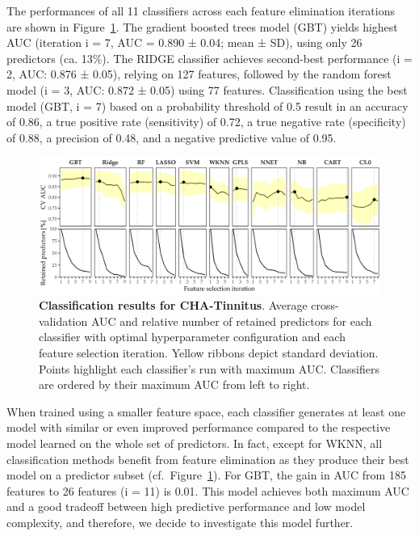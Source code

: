 \documentclass[
  oneside]{book}
\begin{document}
The performances of all 11 classifiers across each feature elimination iterations are shown in Figure~\ref{fig:08-results-pone}.
The gradient boosted trees model (GBT) yields highest AUC (iteration i = 7, AUC = 0.890 ± 0.04; mean ± SD), using only 26 predictors (ca. 13\%).
The RIDGE classifier achieves second-best performance (i = 2, AUC: 0.876 ± 0.05), relying on 127 features, followed by the random forest model (i = 3, AUC: 0.872 ± 0.05) using 77 features.
Classification using the best model (GBT, i = 7) based on a probability threshold of 0.5 result in an accuracy of 0.86, a true positive rate (sensitivity) of 0.72, a true negative rate (specificity) of 0.88, a precision of 0.48, and a negative predictive value of 0.95.



\begin{figure}[htb]

{\centering \includegraphics[width=1\linewidth]{figures/08-results-pone} 

}

\caption{\textbf{Classification results for CHA-Tinnitus}. Average cross-validation AUC and relative number of retained predictors for each classifier with optimal hyperparameter configuration and each feature selection iteration. Yellow ribbons depict standard deviation. Points highlight each classifier's run with maximum AUC. Classifiers are ordered by their maximum AUC from left to right.}\label{fig:08-results-pone}
\end{figure}

When trained using a smaller feature space, each classifier generates at least one model with similar or even improved performance compared to the respective model learned on the whole set of predictors.
In fact, except for WKNN, all classification methods benefit from feature elimination as they produce their best model on a predictor subset (cf.~Figure~\ref{fig:08-results-pone}).
For GBT, the gain in AUC from 185 features to 26 features (i = 11) is 0.01.
This model achieves both maximum AUC and a good tradeoff between high predictive performance and low model complexity, and therefore, we decide to investigate this model further.
\end{document}
